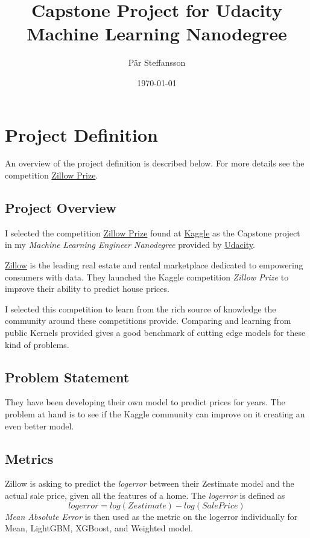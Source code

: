 \documentclass[a4paper]{article}
\title{Capstone Project for Udacity Machine Learning Nanodegree}
\author{Pär Steffansson}
\date{\today}
\begin{document}
\maketitle

\tableofcontents

\section{Project Definition}
An overview of the project definition is described below. For more details see the competition
\href{https://www.kaggle.com/c/zillow-prize-1#description}{Zillow Prize}.

\subsection{Project Overview}
%
%
I selected the competition \href{https://www.kaggle.com/c/zillow-prize-1#description}{Zillow Prize} found at \href{https://www.kaggle.com}{Kaggle} as the Capstone project in my \textit{Machine Learning Engineer Nanodegree} provided by \href{https://www.udacity.com}{Udacity}.

\href{https://www.zillow.com}{Zillow} is the leading real estate and rental marketplace dedicated to empowering consumers with data. They launched the Kaggle competition \textit{Zillow Prize} to improve their ability to predict house prices.

I selected this competition to learn from the rich source of knowledge the community around these competitions provide. Comparing and learning from public Kernels provided gives a good benchmark of cutting edge models for these kind of problems.

\subsection{Problem Statement}
%
%
They have been developing their own model to predict prices for years. The problem at hand is to see if the Kaggle community can improve on it creating an even better model. 
\subsection{Metrics}
%
%
Zillow is asking to predict the \textit{logerror} between their Zestimate model and the
actual sale price, given all the features of a home. The \textit{logerror} is defined as
\[ logerror = log(Zestimate) - log(SalePrice) \]
\textit{Mean Absolute Error} is then used as the metric on the logerror individually for Mean, LightGBM, XGBoost, and Weighted model.
\end{document}

